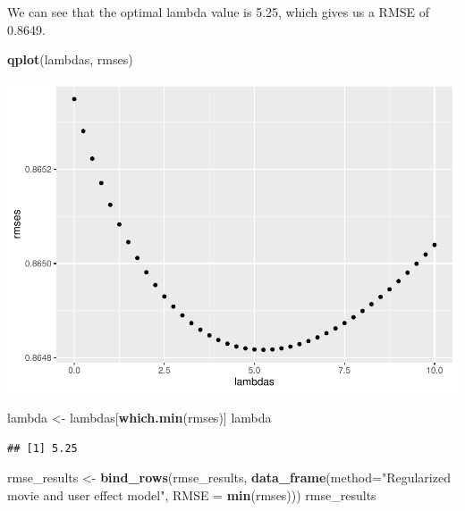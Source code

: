 \documentclass[]{article}
\newenvironment{Shaded}{\begin{snugshade}}{\end{snugshade}}
\newcommand{\DataTypeTok}[1]{\textcolor[rgb]{0.13,0.29,0.53}{#1}}
\newcommand{\KeywordTok}[1]{\textcolor[rgb]{0.13,0.29,0.53}{\textbf{#1}}}
\newcommand{\NormalTok}[1]{#1}
\newcommand{\StringTok}[1]{\textcolor[rgb]{0.31,0.60,0.02}{#1}}
\begin{document}
We can see that the optimal lambda value is 5.25, which gives us a RMSE
of 0.8649.

\begin{Shaded}
\begin{Highlighting}[]
\KeywordTok{qplot}\NormalTok{(lambdas, rmses)  }
\end{Highlighting}
\end{Shaded}

\includegraphics{Project_MovieLens_files/figure-latex/plot_lambdas-1.pdf}

\begin{Shaded}
\begin{Highlighting}[]
\NormalTok{lambda <-}\StringTok{ }\NormalTok{lambdas[}\KeywordTok{which.min}\NormalTok{(rmses)]}
\NormalTok{lambda}
\end{Highlighting}
\end{Shaded}

\begin{verbatim}
## [1] 5.25
\end{verbatim}

\begin{Shaded}
\begin{Highlighting}[]
\NormalTok{rmse_results <-}\StringTok{ }\KeywordTok{bind_rows}\NormalTok{(rmse_results,}
                          \KeywordTok{data_frame}\NormalTok{(}\DataTypeTok{method=}\StringTok{"Regularized movie and user effect model"}\NormalTok{,  }
                                     \DataTypeTok{RMSE =} \KeywordTok{min}\NormalTok{(rmses)))}
\NormalTok{rmse_results}
\end{Highlighting}
\end{Shaded}
\end{document}
